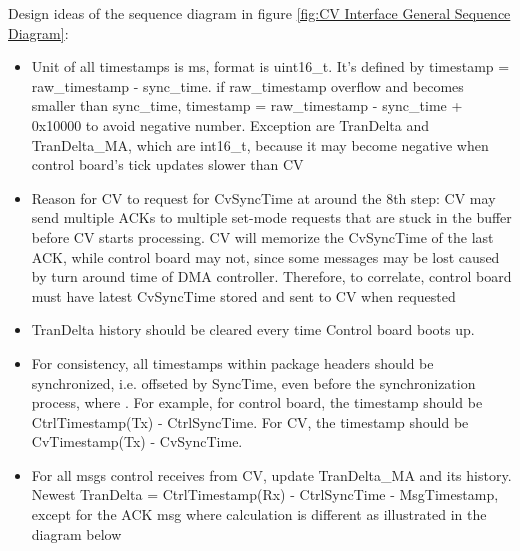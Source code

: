 \documentclass[12pt]{article}
\begin{document}
            Design ideas of the sequence diagram in figure \ref{fig:CV Interface General Sequence Diagram}:
            \begin{itemize}
                \item Unit of all timestamps is ms, format is uint16\_t. It's defined by timestamp = raw\_timestamp - sync\_time. if raw\_timestamp overflow and becomes smaller than sync\_time, timestamp = raw\_timestamp - sync\_time + 0x10000 to avoid negative number. Exception are TranDelta and TranDelta\_MA, which are int16\_t, because it may become negative when control board's tick updates slower than CV
                \item Reason for CV to request for CvSyncTime at around the 8th step: CV may send multiple ACKs to multiple set-mode requests that are stuck in the buffer before CV starts processing. CV will memorize the CvSyncTime of the last ACK, while control board may not, since some messages may be lost caused by turn around time of DMA controller. Therefore, to correlate, control board must have latest CvSyncTime stored and sent to CV when requested
                \item TranDelta history should be cleared every time Control board boots up.
                \item For consistency, all timestamps within package headers should be synchronized, i.e. offseted by SyncTime, even before the synchronization process, where . For example, for control board, the timestamp should be CtrlTimestamp(Tx) - CtrlSyncTime. For CV, the timestamp should be CvTimestamp(Tx) - CvSyncTime.
                \item For all msgs control receives from CV, update TranDelta\_MA and its history. Newest TranDelta = CtrlTimestamp(Rx) - CtrlSyncTime - MsgTimestamp, except for the ACK msg where calculation is different as illustrated in the diagram below
            \end{itemize}
            
\end{document}
